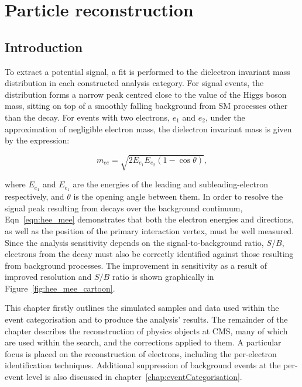 \chapter{Particle reconstruction}
\label{chap:objectReco}

\section{Introduction}

To extract a potential \Hee signal, a fit is performed to the dielectron invariant mass distribution in each constructed analysis category. For \Hee signal events, the \mee distribution forms a narrow peak centred close to the value of the Higgs boson mass, sitting on top of a smoothly falling background from SM processes other than the \Hee decay. For events with two electrons, $e_{1}$ and $e_{2}$, under the approximation of negligible electron mass, the dielectron invariant mass is given by the expression:

\begin{equation}\label{eqn:hee_mee}
    m_{ee} = \sqrt{2E_{e_1}E_{e_2}(1-\cos{\theta})},
\end{equation}


\noindent where $E_{e_1}$ and $E_{e_1}$ are the energies of the leading and subleading-\Et electron respectively, and $\theta$ is the opening angle between them. In order to resolve the signal peak resulting from \Hee decays over the background continuum, Eqn~\ref{eqn:hee_mee} demonstrates that both the electron energies and directions, as well as the position of the primary interaction vertex, must be well measured. Since the analysis sensitivity depends on the signal-to-background ratio, $S/B$, electrons from the \Hee decay must also be correctly identified against those resulting from background processes. The improvement in sensitivity as a result of improved \mee resolution and $S/B$ ratio is shown graphically in Figure~\ref{fig:hee_mee_cartoon}.

This chapter firstly outlines the simulated samples and data used within the event categorisation and to produce the analysis' results. The remainder of the chapter describes the reconstruction of physics objects at CMS, many of which are used within the \Hee search, and the corrections applied to them. A particular focus is placed on the reconstruction of electrons, including the per-electron identification techniques. Additional suppression of background events at the per-event level is also discussed in chapter~\ref{chap:eventCategorisation}. 


